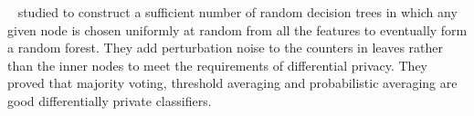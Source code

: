 \documentclass[draftclsnofoot,onecolumn,twoside]{IEEEtran}
\begin{document}
~\cite{Bojarski2014Differentially} studied to construct a sufficient number of random decision trees in which any given node is chosen uniformly at random from all the features to eventually form a random forest. They add perturbation noise to the counters in leaves rather than the inner nodes to meet the requirements of differential privacy. They proved that majority voting, threshold averaging and probabilistic averaging are good differentially private classifiers.







\end{document}
